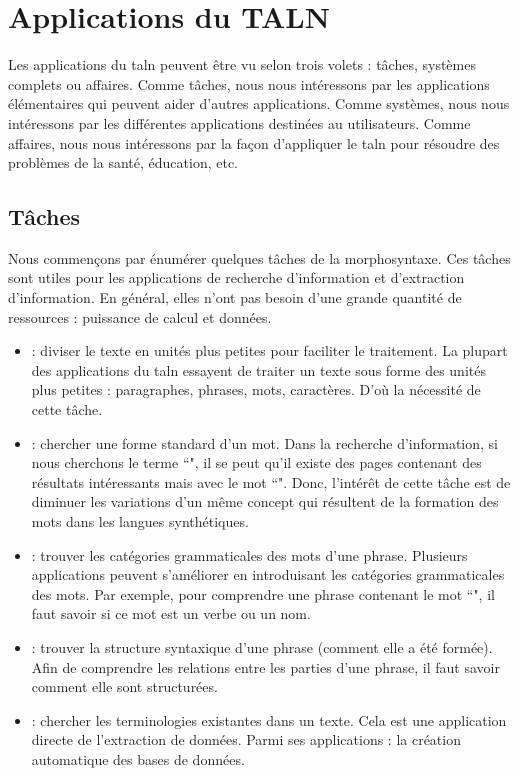 \documentclass{KodeBook}
\begin{document}
\section{Applications du TALN}

Les applications du \ac{taln} peuvent être vu selon trois volets : tâches, systèmes complets ou affaires. 
Comme tâches, nous nous intéressons par les applications élémentaires qui peuvent aider d'autres applications. 
Comme systèmes, nous nous intéressons par les différentes applications destinées au utilisateurs. 
Comme affaires, nous nous intéressons par la façon d'appliquer le \ac{taln} pour résoudre des problèmes de la santé, éducation, etc.

\subsection{Tâches}

Nous commençons par énumérer quelques tâches de la morphosyntaxe. 
Ces tâches sont utiles pour les applications de recherche d'information et d'extraction d'information. 
En général, elles n'ont pas besoin d'une grande quantité de ressources : puissance de calcul et données.
\begin{itemize}
	\item {} : diviser le texte en unités plus petites pour faciliter le traitement. 
	La plupart des applications du \ac{taln} essayent de traiter un texte sous forme des unités plus petites : paragraphes, phrases, mots, caractères.
	D'où la nécessité de cette tâche.
	\item {} : chercher une forme standard d'un mot. 
	Dans la recherche d'information, si nous cherchons le terme ``", il se peut qu'il existe des pages contenant des résultats intéressants mais avec le mot ``". 
	Donc, l'intérêt de cette tâche est de diminuer les variations d'un même concept qui résultent de la formation des mots dans les langues synthétiques.
	\item {} : trouver les catégories grammaticales des mots d'une phrase. 
	Plusieurs applications peuvent s'améliorer en introduisant les catégories grammaticales des mots. 
	Par exemple, pour comprendre une phrase contenant le mot ``", il faut savoir si ce mot est un verbe ou un nom.
	\item {} : trouver la structure syntaxique d'une phrase (comment elle a été formée).
	Afin de comprendre les relations entre les parties d'une phrase, il faut savoir comment elle sont structurées.
	\item {} : chercher les terminologies existantes dans un texte. 
	Cela est une application directe de l'extraction de données. 
	Parmi ses applications : la création automatique des bases de données.
\end{itemize}
\end{document}
